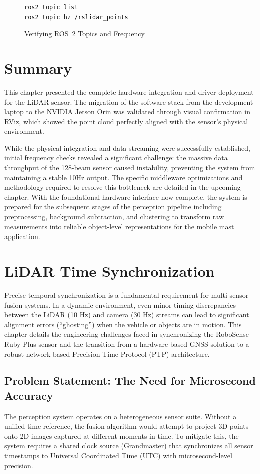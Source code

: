 \documentclass[12pt,a4paper]{report}
\begin{document}
\begin{figure}[ht!]
    \centering
    \begin{verbatim}
ros2 topic list
ros2 topic hz /rslidar_points
    \end{verbatim}
    \caption{Verifying ROS~2 Topics and Frequency}
\end{figure}

\section{Summary}
This chapter presented the complete hardware integration and driver deployment for the LiDAR sensor. The migration of the software stack from the development laptop to the NVIDIA Jetson Orin was validated through visual confirmation in RViz, which showed the point cloud perfectly aligned with the sensor's physical environment.

While the physical integration and data streaming were successfully established, initial frequency checks revealed a significant challenge: the massive data throughput of the 128-beam sensor caused instability, preventing the system from maintaining a stable 10Hz output. The specific middleware optimizations and methodology required to resolve this bottleneck are detailed in the upcoming chapter. With the foundational hardware interface now complete, the system is prepared for the subsequent stages of the perception pipeline including preprocessing, background subtraction, and clustering to transform raw measurements into reliable object-level representations for the mobile mast application.


\section{LiDAR Time Synchronization}


Precise temporal synchronization is a fundamental requirement for multi-sensor fusion systems. In a dynamic environment, even minor timing discrepancies between the LiDAR (10 Hz) and camera (30 Hz) streams can lead to significant alignment errors (``ghosting'') when the vehicle or objects are in motion. This chapter details the engineering challenges faced in synchronizing the RoboSense Ruby Plus sensor and the transition from a hardware-based GNSS solution to a robust network-based Precision Time Protocol (PTP) architecture.

\subsection{Problem Statement: The Need for Microsecond Accuracy}
The perception system operates on a heterogeneous sensor suite. Without a unified time reference, the fusion algorithm would attempt to project 3D points onto 2D images captured at different moments in time. To mitigate this, the system requires a shared clock source (Grandmaster) that synchronizes all sensor timestamps to Universal Coordinated Time (UTC) with microsecond-level precision.
\end{document}
